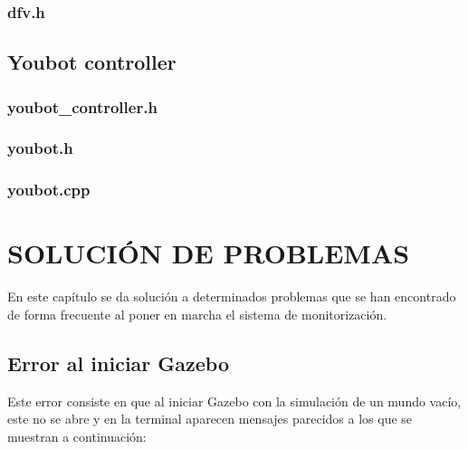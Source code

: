 \documentclass[12pt, a4paper]{report}
\begin{document}
\subsection{dfv.h}
\lstset{inputencoding=utf8/latin1}

\newpage

\section{Youbot controller}

\subsection{youbot\_controller.h}
\lstset{inputencoding=utf8/latin1}

\newpage

\subsection{youbot.h}
\lstset{inputencoding=utf8/latin1}

\newpage

\subsection{youbot.cpp}
\lstset{inputencoding=utf8/latin1}

\newpage

\fi

\chapter{SOLUCIÓN DE PROBLEMAS}

En este capítulo se da solución a determinados problemas que se han encontrado de forma frecuente al poner en marcha el sistema de monitorización.

\section{Error al iniciar Gazebo}

Este error consiste en que al iniciar Gazebo con la simulación de un mundo vacío, este no se abre y en la terminal aparecen mensajes parecidos a los que se muestran a continuación:
\end{document}
